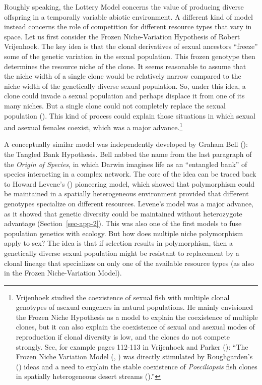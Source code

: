 \documentclass[
  letterpaper,
]{book}
\begin{document}
Roughly speaking, the Lottery Model concerns the value of producing
diverse offspring in a temporally variable abiotic environment. A
different kind of model instead concerns the role of competition for
different resource types that vary in space. Let us first consider the
Frozen Niche-Variation Hypothesis of Robert Vrijenhoek. The key idea is
that the clonal derivatives of sexual ancestors ``freeze'' some of the
genetic variation in the sexual population. This frozen genotype then
determines the resource niche of the clone. It seems reasonable to
assume that the niche width of a single clone would be relatively narrow
compared to the niche width of the genetically diverse sexual
population. So, under this idea, a clone could invade a sexual
population and perhaps displace it from one of its many niches. But a
single clone could not completely replace the sexual population
(). This kind of process
could explain those situations in which sexual and asexual females
coexist, which was a major advance.\footnote{Vrijenhoek studied the
  coexistence of sexual fish with multiple clonal genotypes of asexual
  congeners in natural populations. He mainly envisioned the Frozen
  Niche Hypothesis as a model to explain the coexistence of multiple
  clones, but it can also explain the coexistence of sexual and asexual
  modes of reproduction if clonal diversity is low, and the clones do
  not compete strongly. See, for example pages 112-113 in Vrijenhoek and
  Parker (): ``The Frozen Niche
  Variation Model (,
  ) was directly stimulated by
  Roughgarden's () ideas and a need
  to explain the stable coexistence of \emph{Poeciliopsis} fish clones
  in spatially heterogeneous desert streams
  ().''}

A conceptually similar model was independently developed by Graham Bell
(): the Tangled Bank Hypothesis. Bell
nabbed the name from the last paragraph of the \emph{Origin of Species},
in which Darwin imagines life as an ``entangled bank'' of species
interacting in a complex network. The core of the idea can be traced
back to Howard Levene's () pioneering
model, which showed that polymorphism could be maintained in a spatially
heterogeneous environment provided that different genotypes specialize
on different resources. Levene's model was a major advance, as it showed
that genetic diversity could be maintained without heterozygote
advantage (Section~\ref{sec-app-2}). This was also one of the first
models to fuse population genetics with ecology. But how does multiple
niche polymorphism apply to sex? The idea is that if selection results
in polymorphism, then a genetically diverse sexual population might be
resistant to replacement by a clonal lineage that specializes on only
one of the available resource types (as also in the Frozen
Niche-Variation Model).
\end{document}
